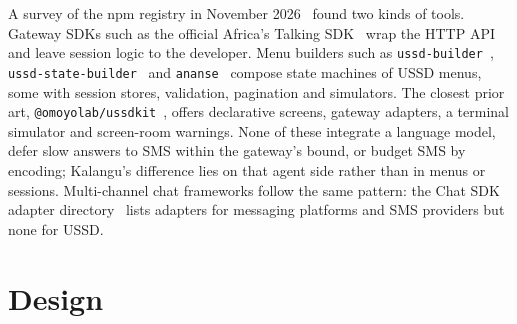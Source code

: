 \documentclass[conference]{IEEEtran}
\begin{document}
A survey of the npm registry in November 2026~\cite{kalanguRepo} found two
kinds of tools. Gateway SDKs such as the official Africa's Talking
SDK~\cite{atnode} wrap the HTTP API and leave session logic to the developer.
Menu builders such as \texttt{ussd-builder}~\cite{ussdbuilder},
\texttt{ussd-state-builder}~\cite{ussdstate} and \texttt{ananse}~\cite{ananse}
compose state machines of USSD menus, some with session stores, validation,
pagination and simulators. The closest prior art,
\texttt{@omoyolab/ussdkit}~\cite{ussdkit}, offers declarative screens, gateway
adapters, a terminal simulator and screen-room warnings. None of these
integrate a language model, defer slow answers to SMS within the gateway's
bound, or budget SMS by encoding; Kalangu's difference lies on that agent side
rather than in menus or sessions. Multi-channel chat frameworks follow the
same pattern: the Chat SDK adapter directory~\cite{chatsdk} lists adapters for
messaging platforms and SMS providers but none for USSD.

\section{Design}
\label{sec:design}
\end{document}
